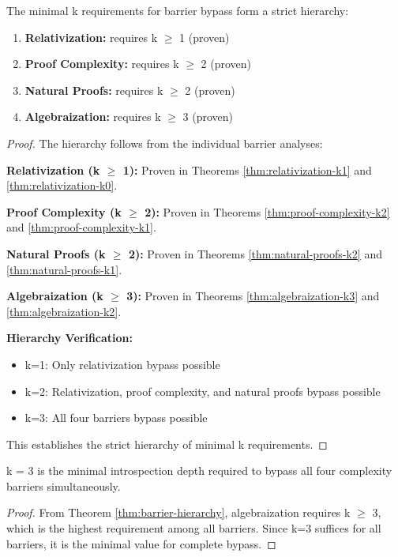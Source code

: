 \documentclass[11pt]{article}
\begin{document}
\begin{theorem}
\label{thm:barrier-hierarchy}
The minimal k requirements for barrier bypass form a strict hierarchy:
\begin{enumerate}
\item \textbf{Relativization:} requires k $\geq$ 1 (proven)
\item \textbf{Proof Complexity:} requires k $\geq$ 2 (proven)
\item \textbf{Natural Proofs:} requires k $\geq$ 2 (proven)
\item \textbf{Algebraization:} requires k $\geq$ 3 (proven)
\end{enumerate}
\end{theorem}

\begin{proof}
The hierarchy follows from the individual barrier analyses:

\textbf{Relativization (k $\geq$ 1):} Proven in Theorems \ref{thm:relativization-k1} and \ref{thm:relativization-k0}.

\textbf{Proof Complexity (k $\geq$ 2):} Proven in Theorems \ref{thm:proof-complexity-k2} and \ref{thm:proof-complexity-k1}.

\textbf{Natural Proofs (k $\geq$ 2):} Proven in Theorems \ref{thm:natural-proofs-k2} and \ref{thm:natural-proofs-k1}.

\textbf{Algebraization (k $\geq$ 3):} Proven in Theorems \ref{thm:algebraization-k3} and \ref{thm:algebraization-k2}.

\textbf{Hierarchy Verification:}
\begin{itemize}
\item k=1: Only relativization bypass possible
\item k=2: Relativization, proof complexity, and natural proofs bypass possible
\item k=3: All four barriers bypass possible
\end{itemize}

This establishes the strict hierarchy of minimal k requirements.
\end{proof}

\begin{corollary}
\label{cor:optimal-k}
k = 3 is the minimal introspection depth required to bypass all four complexity barriers simultaneously.
\end{corollary}

\begin{proof}
From Theorem \ref{thm:barrier-hierarchy}, algebraization requires k $\geq$ 3, which is the highest requirement among all barriers. Since k=3 suffices for all barriers, it is the minimal value for complete bypass.
\end{proof}
\end{document}
